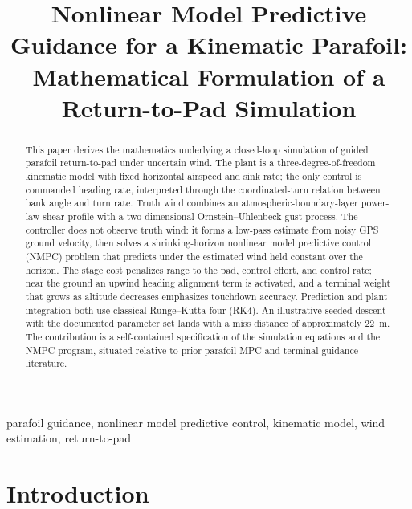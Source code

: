 \documentclass[conference]{IEEEtran}
\begin{document}
\title{Nonlinear Model Predictive Guidance for a Kinematic Parafoil:\\
Mathematical Formulation of a Return-to-Pad Simulation}

\author{
}

\maketitle

\begin{abstract}
This paper derives the mathematics underlying a closed-loop simulation of guided parafoil return-to-pad under uncertain wind.
The plant is a three-degree-of-freedom kinematic model with fixed horizontal airspeed and sink rate; the only control is commanded heading rate, interpreted through the coordinated-turn relation between bank angle and turn rate.
Truth wind combines an atmospheric-boundary-layer power-law shear profile with a two-dimensional Ornstein--Uhlenbeck gust process.
The controller does not observe truth wind: it forms a low-pass estimate from noisy GPS ground velocity, then solves a shrinking-horizon nonlinear model predictive control (NMPC) problem that predicts under the estimated wind held constant over the horizon.
The stage cost penalizes range to the pad, control effort, and control rate; near the ground an upwind heading alignment term is activated, and a terminal weight that grows as altitude decreases emphasizes touchdown accuracy.
Prediction and plant integration both use classical Runge--Kutta four (RK4).
An illustrative seeded descent with the documented parameter set lands with a miss distance of approximately \SI{22}{\meter}.
The contribution is a self-contained specification of the simulation equations and the NMPC program, situated relative to prior parafoil MPC and terminal-guidance literature.
\end{abstract}

\begin{IEEEkeywords}
parafoil guidance, nonlinear model predictive control, kinematic model, wind estimation, return-to-pad
\end{IEEEkeywords}

\section{Introduction}
\end{document}
